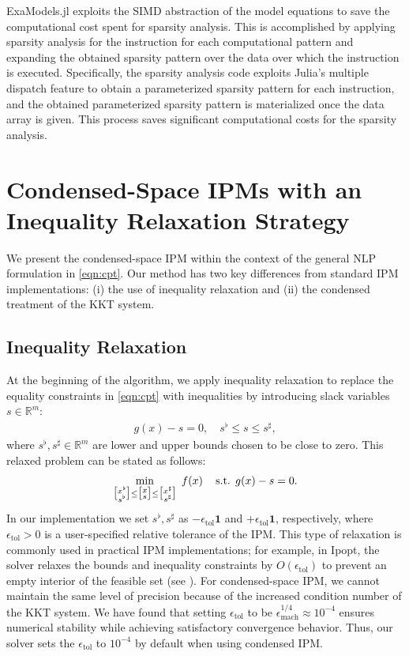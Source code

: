 \documentclass{IEEEtran4PSCC} %
\newcommand{\st}{\mathop{\text{\normalfont s.t.}}}
\begin{document}
ExaModels.jl exploits the SIMD abstraction of the model equations to
save the computational cost spent for sparsity analysis.  This is
accomplished by applying sparsity analysis for the instruction for
each computational pattern and expanding the obtained sparsity pattern
over the data over which the instruction is executed. Specifically,
the sparsity analysis code exploits Julia's multiple dispatch feature
to obtain a parameterized sparsity pattern for each instruction, and the
obtained parameterized sparsity pattern is materialized once the data
array is given. This process saves significant computational costs
for the sparsity analysis.

\section{Condensed-Space IPMs with an Inequality Relaxation Strategy}\label{sec:ipm}
We present the condensed-space IPM within the
context of the general NLP formulation in \eqref{eqn:cpt}. Our method
has two key differences from standard IPM
implementations: (i) the use of inequality relaxation and (ii) the
condensed treatment of the KKT system.

\subsection{Inequality Relaxation}

At the beginning of the algorithm, we apply inequality relaxation to replace the equality constraints in \eqref{eqn:cpt} with inequalities by introducing slack variables $s\in\mathbb{R}^{m}$:
\begin{align}\label{eqn:relax}
  g(x)- s = 0,\quad s^{\flat}\leq s\leq  s^\sharp,
\end{align}
where $s^\flat,s^\sharp\in\mathbb{R}^{m}$ are lower and upper bounds chosen to be close to zero.
This relaxed problem can be stated as follows:
\begin{equation}\label{eqn:relaxed}
    \min_{\big[\substack{x^\flat\\s^\flat}\big]\leq \big[\substack{x\\s}\big] \leq \big[\substack{x^\sharp\\s^\sharp}\big]}\;
      f(x)\quad \st\;  g(x) - s = 0.
\end{equation}
In our implementation we set $s^{\flat},s^\sharp$ as
$-\epsilon_{\text{tol}}\boldsymbol{1}$ and $+\epsilon_{\text{tol}}\boldsymbol{1}$, respectively,
where $\epsilon_{\text{tol}}>0$ is a user-specified relative tolerance
of the IPM. This type of relaxation is
commonly used in practical IPM implementations; for example, in Ipopt,
the solver relaxes the bounds and inequality constraints by
$O(\epsilon_{\text{tol}})$ to prevent an empty interior of the
feasible set (see \cite[Section 3.5]{wachter2006implementation}).
For condensed-space IPM, we cannot maintain the same level of precision
because of the increased condition number of the KKT system.
We have found that setting $\epsilon_{\text{tol}}$ to be
$\epsilon_{\text{mach}}^{1/4}\approx 10^{-4}$ ensures numerical
stability while achieving satisfactory convergence behavior. Thus, our
solver sets the $\epsilon_\text{tol}$ to $10^{-4}$ by default when using condensed
IPM.
\end{document}
